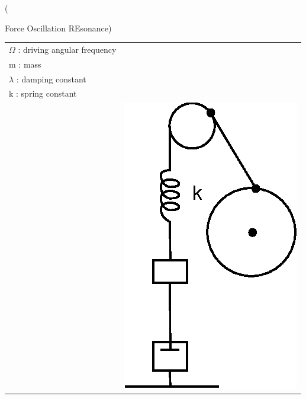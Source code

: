 \documentclass[a4paper,oneside,12pt]{report}
\begin{document}
\centerline(Force Oscillation REsonance)\\
\begin{tabular}{l|l}
$\Omega$ : driving angular frequency \\
m : mass \\
$\lambda$ : damping constant \\
k : spring constant\\
{} & \includegraphics[scale=1, bottom]{3Dec.eps}\\
\end{tabular}
\end{document}
